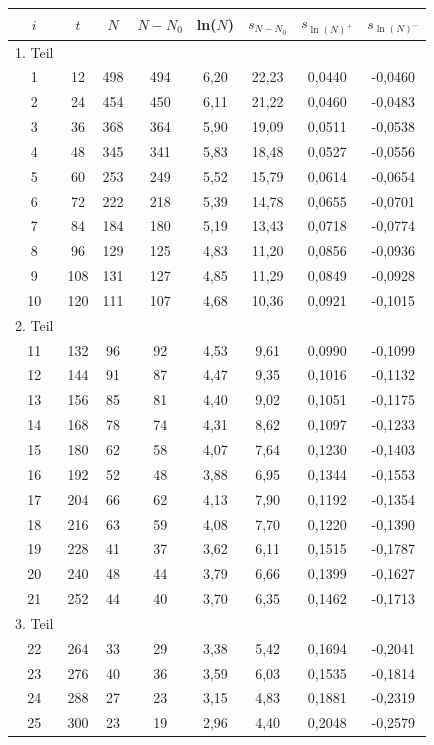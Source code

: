 \renewcommand{\arraystretch}{0.97}
\begin{table}[H]
 \begin{tabular}{c|c|c|c|c|c|c|c}
 $i$ & $t$ & $N$ & $N-N_0$ & ln($N$) & $s_{N-N_0}$& $s_{\ln(N)^+}$ & $s_{\ln(N)^-}$ \\
 \hline
1. Teil\\
 \hline
1&	12&	498&	494&	6,20&	22,23&	0,0440&	-0,0460\\
2&	24&	454&	450&	6,11&	21,22&	0,0460&	-0,0483\\
3&	36&	368&	364&	5,90&	19,09&	0,0511&	-0,0538\\
4&	48&	345&	341&	5,83&	18,48&	0,0527&	-0,0556\\
5&	60&	253&	249&	5,52&	15,79&	0,0614&	-0,0654\\
6&	72&	222&	218&	5,39&	14,78&	0,0655&	-0,0701\\
7&	84&	184&	180&	5,19&	13,43&	0,0718&	-0,0774\\
8&	96&	129&	125&	4,83&	11,20&	0,0856&	-0,0936\\
9&	108&	131&	127&	4,85&	11,29&	0,0849&	-0,0928\\
10&	120&	111&	107&	4,68&	10,36&	0,0921&	-0,1015\\
\hline
2. Teil\\
\hline
11&	132&	96&	92&	4,53&	9,61&	0,0990&	-0,1099\\
12&	144&	91&	87&	4,47&	9,35&	0,1016&	-0,1132\\
13&	156&	85&	81&	4,40&	9,02&	0,1051&	-0,1175\\
14&	168&	78&	74&	4,31&	8,62&	0,1097&	-0,1233\\
15&	180&	62&	58&	4,07&	7,64&	0,1230&	-0,1403\\
16&	192&	52&	48&	3,88&	6,95&	0,1344&	-0,1553\\
17&	204&	66&	62&	4,13&	7,90&	0,1192&	-0,1354\\
18&	216&	63&	59&	4,08&	7,70&	0,1220&	-0,1390\\
19&	228&	41&	37&	3,62&	6,11&	0,1515&	-0,1787\\
20&	240&	48&	44&	3,79&	6,66&	0,1399&	-0,1627\\
21&	252&	44&	40&	3,70&	6,35&	0,1462&	-0,1713\\
\hline
3. Teil\\
\hline
22&	264&	33&	29&	3,38&	5,42&	0,1694&	-0,2041\\
23&	276&	40&	36&	3,59&	6,03&	0,1535&	-0,1814\\
24&	288&	27&	23&	3,15&	4,83&	0,1881&	-0,2319\\
25&	300&	23&	19&	2,96&	4,40&	0,2048&	-0,2579\\

\end{tabular}
\end{table}

